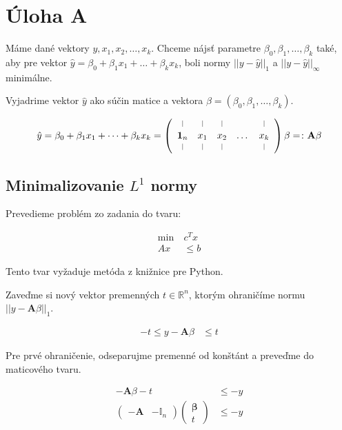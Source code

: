 \documentclass[12pt,oneside,a4paper,slovak]{article}
\newcommand*{\vertbar}{\rule[0ex]{0.3pt}{1.5ex}}
\begin{document}
   

\section*{Úloha A}

Máme dané vektory $y, x_1, x_2, \dots, x_k$. Chceme nájsť parametre $\beta_0, \beta_1,\dots,\beta_k$ také, aby pre vektor $\hat{y} = \beta_0 + \beta_1x_1 + \dots + \beta_kx_k$, boli normy $||y - \hat{y}||_1$ a $||y - \hat{y}||_{\infty}$ minimálne. 

Vyjadrime vektor $\hat{y}$ ako súčin matice a vektora $\beta = (\beta_0, \beta_1, \dots, \beta_k)$.

\begin{align*}
	\hat{y} = \beta_0 + \beta_1x_1 + \dots + \beta_kx_k = 
	\left(
		\begin{array}{ccccc}
			\vertbar & \vertbar & \vertbar &  & \vertbar \\
			\mathbf{1}_n & x_1 & x_2 & \dots & x_k \\
			\vertbar & \vertbar & \vertbar &  & \vertbar
		\end{array}
	\right)
	\beta
	=\colon
	\mathbf{A} \beta
\end{align*}

\subsection*{Minimalizovanie $L^1$ normy}

Prevedieme problém zo zadania do tvaru:

\begin{align*}
	\text{min}~ &c^Tx\\
	Ax &\leq b
\end{align*}

Tento tvar vyžaduje metóda  z knižnice  pre Python.

Zaveďme si nový vektor premenných $t \in \mathbb{R}^n$, ktorým ohraničíme normu $||y - \mathbf{A} \beta||_1$.

\begin{align*}
	-t \leq y - \mathbf{A} \beta &\leq t
\end{align*}	

Pre prvé ohraničenie, odseparujme premenné od konštánt a preveďme do maticového tvaru.

\begin{align*}
	- \mathbf{A} \beta - t &\leq -y \\
	\left(
		\begin{array}{c|c}
			-\mathbf{A} & -\mathbb{I}_n
		\end{array}
	\right)
	\left(
		\begin{array}{c}
			\boldsymbol{\beta} \\
			\hline
			t
		\end{array}
	\right) &\leq -y
\end{align*}
\end{document}
